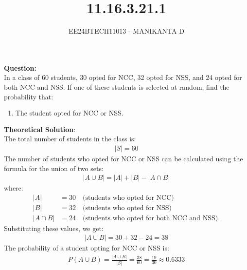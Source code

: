\documentclass[journal]{IEEEtran}
\begin{document}

\vspace{3cm}

\title{11.16.3.21.1}
\author{EE24BTECH11013 - MANIKANTA D}
{\let\newpage\relax\maketitle}

\renewcommand{\thefigure}{\theenumi}
\renewcommand{\thetable}{\theenumi}
\setlength{\intextsep}{10pt} %

\renewcommand{\thetable}{\theenumi}

\textbf{Question:}\\
In a class of 60 students, 30 opted for NCC, 32 opted for NSS, and 24 opted for both NCC and NSS. If one of these students is selected at random, find the probability that:
\begin{enumerate}
    \item The student opted for NCC or NSS.
\end{enumerate}

\textbf{Theoretical Solution}:\\
The total number of students in the class is:
\begin{align}
    |S| = 60
\end{align}
The number of students who opted for NCC or NSS can be calculated using the formula for the union of two sets:
\begin{align}
    |A \cup B| = |A| + |B| - |A \cap B|
\end{align}
where:
\begin{align}
    |A| &= 30 \quad \text{(students who opted for NCC)} \\
    |B| &= 32 \quad \text{(students who opted for NSS)} \\
    |A \cap B| &= 24 \quad \text{(students who opted for both NCC and NSS)}.
\end{align}
Substituting these values, we get:
\begin{align}
    |A \cup B| = 30 + 32 - 24 = 38
\end{align}
The probability of a student opting for NCC or NSS is:
\begin{align}
    P(A \cup B) = \frac{|A \cup B|}{|S|} = \frac{38}{60} = \frac{19}{30} \approx 0.6333
\end{align}
\end{document}
